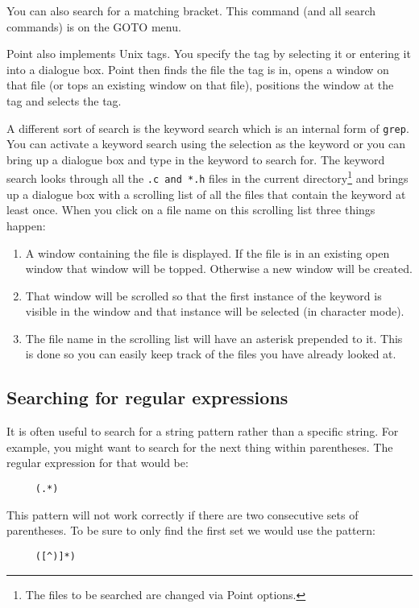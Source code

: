 You can also search for a matching bracket.
This command (and all search commands) is on the GOTO menu.

Point also implements Unix tags.
You specify the tag by selecting it or entering it into a dialogue box.
Point then finds the file the tag is in, opens a window on that file
(or tops an existing window on that file),
positions the window at the tag and selects the tag.

A different sort of search is the keyword search which is an internal
form of {\tt grep}.
You can activate a keyword search using the selection as the keyword
or you can bring up a dialogue box and type in the keyword
to search for.
The keyword search looks through all the {\tt *.c and *.h} files
in the current directory\footnote{The files to be searched are
changed via Point options.}
and brings up a dialogue box with a scrolling list of all the
files that contain the keyword at least once.
When you click on a file name on this scrolling list three things happen:
\begin{enumerate}
\item A window containing the file is displayed.
If the file is in an existing open window that window will be topped.
Otherwise a new window will be created.
\item That window will be scrolled so that the first instance
of the keyword is visible in the window and that instance will
be selected (in character mode).
\item The file name in the scrolling list will have an asterisk
prepended to it.
This is done so you can easily keep track of the files you have
already looked at.
\end{enumerate}


\subsection{Searching for regular expressions}

It is often useful to search for a string pattern rather than a
specific string.
For example, you might want to search for the next thing within
parentheses.
The regular expression for that would be:
\begin{verbatim}
     (.*)
\end{verbatim}
This pattern will not work correctly if there are two consecutive
sets of parentheses.
To be sure to only find the first set we would use the pattern:
\begin{verbatim}
     ([^)]*)
\end{verbatim}

